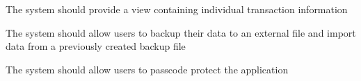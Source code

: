 \begin{adjustwidth}{1.5em}{0pt}
\begin{mainlist}
		\item The system should provide a view containing individual transaction information
		
		\item The system should allow users to backup their data to an external file and import data from a previously created backup file
		
		\item The system should allow users to passcode protect the application
		
	\end{mainlist}

	
\end{adjustwidth}
